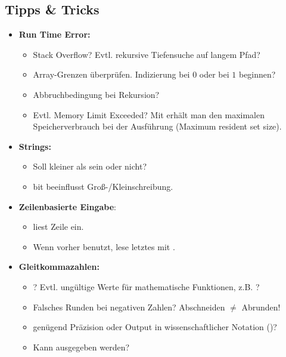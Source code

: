 \subsection{Tipps \& Tricks}

\begin{itemize}
	\item \textbf{Run Time Error:}
	\begin{itemize}
		\item Stack Overflow? Evtl. rekursive Tiefensuche auf langem Pfad?
		\item Array-Grenzen überprüfen. Indizierung bei $0$ oder bei $1$ beginnen?
		\item Abbruchbedingung bei Rekursion?
		\item Evtl. Memory Limit Exceeded? Mit  erhält man den maximalen Speicherverbrauch bei der Ausführung (Maximum resident set size).
	\end{itemize}
	
	\item \textbf{Strings:}
	\begin{itemize}
		\item Soll  kleiner als  sein oder nicht?
		\item bit  beeinflusst Groß-/Kleinschreibung.
	\end{itemize}

	\item \textbf{Zeilenbasierte Eingabe}:
	\begin{itemize}
		\item {} liest Zeile ein.
		\item Wenn vorher  benutzt, lese letztes \code{\\n} mit .
	\end{itemize}
	
	\item \textbf{Gleitkommazahlen:}
	\begin{itemize}
		\item {}? Evtl. ungültige Werte für mathematische Funktionen, z.B. \mbox{}?
		\item Falsches Runden bei negativen Zahlen? Abschneiden $\neq$ Abrunden!
		\item genügend Präzision oder Output in wissenschaftlicher Notation ()?
		\item Kann  ausgegeben werden?
	\end{itemize}


\end{itemize}
